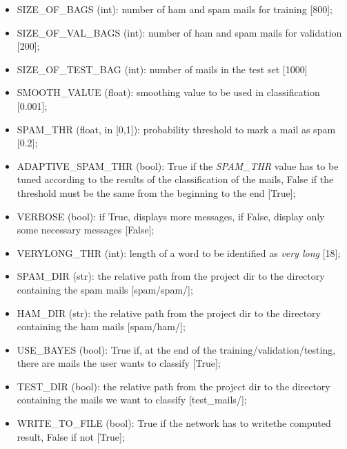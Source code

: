 \documentclass[letterpaper,10pt,english]{sphinxmanual}
\begin{document}
\begin{fulllineitems}
\begin{itemize}
\item {} 
SIZE\_OF\_BAGS (int): number of ham and spam mails for training {[}800{]};

\item {} 
SIZE\_OF\_VAL\_BAGS (int): number of ham and spam mails for validation {[}200{]};

\item {} 
SIZE\_OF\_TEST\_BAG (int): number of mails in the test set {[}1000{]}

\item {} 
SMOOTH\_VALUE (float): smoothing value to be used in classification {[}0.001{]};

\item {} 
SPAM\_THR (float, in {[}0,1{]}): probability threshold to mark a mail as spam {[}0.2{]};

\item {} 
ADAPTIVE\_SPAM\_THR (bool): True if the \emph{SPAM\_THR} value has to be tuned according        to the results of the classification of the mails, False if the threshold        must be the same from the beginning to the end {[}True{]};

\item {} 
VERBOSE (bool): if True, displays more messages, if False, display only some        necessary messages {[}False{]};

\item {} 
VERYLONG\_THR (int): length of a word to be identified as \emph{very long} {[}18{]};

\item {} 
SPAM\_DIR (str): the relative path from the project dir to the directory        containing the spam mails {[}spam/spam/{]};

\item {} 
HAM\_DIR (str): the relative path from the project dir to the directory        containing the ham mails {[}spam/ham/{]};

\item {} 
USE\_BAYES (bool): True if, at the end of the training/validation/testing,        there are mails the user wants to classify {[}True{]};

\item {} 
TEST\_DIR (bool): the relative path from the project dir to the directory        containing the mails we want to classify {[}test\_mails/{]};

\item {} 
WRITE\_TO\_FILE (bool): True if the network has to writethe computed        result, False if not {[}True{]};


\end{itemize}
\end{fulllineitems}
\end{document}

